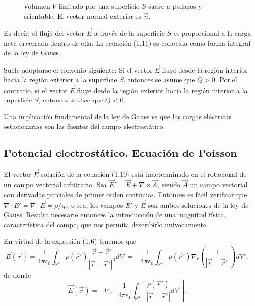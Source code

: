 \documentclass[12pt,a4paper]{book}
\begin{document}
\begin{figure}
\centering
\caption{Volumen $V$ limitado por una superficie $S$ suave a pedazos y orientable. El vector normal exterior es $\vec{n}$.}
\label{fig:1.2}
\end{figure}

Es decir, el flujo del vector $\vec{E}$ a través de la superficie $S$ es proporcional a la carga neta encerrada dentro de ella. La ecuación (1.11) es conocida como forma integral de la ley de Gauss.

Suele adoptarse el convenio siguiente: Si el vector $\vec{E}$ fluye desde la región interior hacia la región exterior a la superficie $S$, entonces se asume que $Q > 0$. Por el contrario, si el vector $\vec{E}$ fluye desde la región exterior hacia la región interior a la superficie $S$, entonces se dice que $Q < 0$.

Una implicación fundamental de la ley de Gauss es que las cargas eléctricas estacionarias son las fuentes del campo electrostático.

\subsection{Potencial electrostático. Ecuación de Poisson}

El vector $\vec{E}$ solución de la ecuación (1.10) está indeterminado en el rotacional de un campo vectorial arbitrario. Sea $\vec{E}' = \vec{E} + \nabla \times \vec{A}$, siendo $\vec{A}$ un campo vectorial con derivadas parciales de primer orden continuas. Entonces es fácil verificar que $\nabla \cdot \vec{E}' = \nabla \cdot \vec{E} = \rho/\epsilon_0$, o sea, los campos $\vec{E}'$ y $\vec{E}$ son ambos soluciones de la ley de Gauss. Resulta necesario entonces la introducción de una magnitud física, característica del campo, que nos permita describirlo unívocamente.

En virtud de la expresión (1.6) tenemos que
\begin{equation}
\vec{E}(\vec{r}) = \frac{1}{4\pi\epsilon_0} \int_{\mathbb{R}^3} \rho(\vec{r}') \frac{\vec{r}-\vec{r}'}{|\vec{r}-\vec{r}'|^3}dV' = -\frac{1}{4\pi\epsilon_0} \int_{\mathbb{R}^3} \rho(\vec{r}') \nabla_r \left( \frac{1}{|\vec{r}-\vec{r}'|} \right) dV',
\end{equation}
de donde
\begin{equation}
\vec{E}(\vec{r}) = -\nabla_r \left[ \frac{1}{4\pi\epsilon_0} \int_{\mathbb{R}^3} \frac{\rho(\vec{r}')}{|\vec{r}-\vec{r}'|}dV' \right].
\end{equation}
\end{document}
